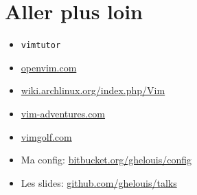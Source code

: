 \documentclass{beamer}
\begin{document}
\section{Aller plus loin}
\begin{frame}
  \begin{itemize}
    \item {\tt vimtutor}
    \item \href{http://www.openvim.com/}{openvim.com}
    \item \href{https://wiki.archlinux.org/index.php/Vim}{wiki.archlinux.org/index.php/Vim}
    \item \href{https://vim-adventures.com/}{vim-adventures.com}
    \item \href{https://vimgolf.com/}{vimgolf.com}
  \end{itemize}
\end{frame}

\begin{frame}
  \begin{itemize}
    \item Ma config: \href{https://bitbucket.org/ghelouis/config}{bitbucket.org/ghelouis/config}
    \item Les slides: \href{https://github.com/ghelouis/talks}{github.com/ghelouis/talks}
  \end{itemize}
\end{frame}
\end{document}
